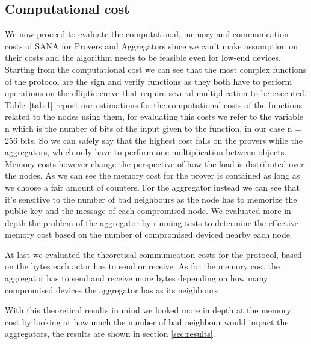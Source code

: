 \subsection{Computational cost}
We now proceed to evaluate the computational, memory and communication costs of SANA for Provers and Aggregators since we can't make assumption on their costs and the algorithm needs to be feasible even for low-end devices.
Starting from the computational cost we can see that the most complex functions of the protocol are the sign and verify functions as they both have to perform operations on the elliptic curve that require several multiplication to be executed.
Table~\ref{tab:1} report our estimations for the computational costs of the functions related to the nodes using them, for evaluating this costs we refer to the variable n which is the number of bits of the input given to the function, in our case n = 256 bits.
So we can safely say that the highest cost falls on the provers while the aggregators, which only have to perform one multiplication between objects.
Memory costs however change the perspective of how the load is distributed over the nodes.
As we can see the memory cost for the prover is contained as long as we choose a fair amount of counters. For the aggregator instead we can see that it's sensitive to the number of bad neighbours as the node has to memorize the public key and the message of each compromised node.
We evaluated more in depth the problem of the aggregator by running tests to determine the effective memory cost based on the number of compromised deviced nearby each node

At last we evaluated the theoretical communication costs for the protocol, based on the bytes each actor has to send or receive.
As for the memory cost the aggregator has to send and receive more bytes depending on how many compromised devices the aggregator has as its neighbours

With this theoretical results in mind we looked more in depth at the memory cost by looking at how much the number of bad neighbour would impact the aggregators, the results are shown in section \ref{sec:results}.

